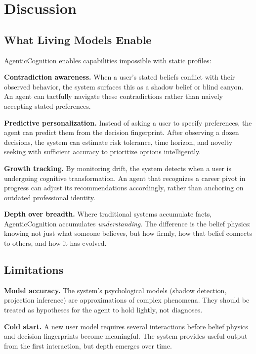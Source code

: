 \documentclass[10pt, twocolumn]{article}
\begin{document}
\section{Discussion}
\label{sec:discussion}

\subsection{What Living Models Enable}

AgenticCognition enables capabilities impossible with static profiles:

\textbf{Contradiction awareness.} When a user's stated beliefs conflict with their observed behavior, the system surfaces this as a shadow belief or blind canyon. An agent can tactfully navigate these contradictions rather than naively accepting stated preferences.

\textbf{Predictive personalization.} Instead of asking a user to specify preferences, the agent can predict them from the decision fingerprint. After observing a dozen decisions, the system can estimate risk tolerance, time horizon, and novelty seeking with sufficient accuracy to prioritize options intelligently.

\textbf{Growth tracking.} By monitoring drift, the system detects when a user is undergoing cognitive transformation. An agent that recognizes a career pivot in progress can adjust its recommendations accordingly, rather than anchoring on outdated professional identity.

\textbf{Depth over breadth.} Where traditional systems accumulate facts, AgenticCognition accumulates \emph{understanding}. The difference is the belief physics: knowing not just what someone believes, but how firmly, how that belief connects to others, and how it has evolved.

\subsection{Limitations}

\textbf{Model accuracy.} The system's psychological models (shadow detection, projection inference) are approximations of complex phenomena. They should be treated as hypotheses for the agent to hold lightly, not diagnoses.

\textbf{Cold start.} A new user model requires several interactions before belief physics and decision fingerprints become meaningful. The system provides useful output from the first interaction, but depth emerges over time.
\end{document}
